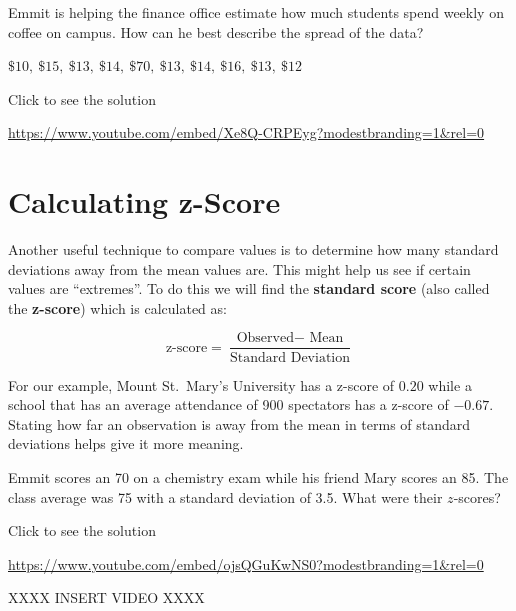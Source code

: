 \documentclass[
  letterpaper,
  DIV=11,
  numbers=noendperiod]{scrreprt}
\begin{document}
\begin{tcolorbox}[enhanced jigsaw, colframe=quarto-callout-tip-color-frame, colback=white, breakable, rightrule=.15mm, title=\textcolor{quarto-callout-tip-color}{\faLightbulb}\hspace{0.5em}{Try it Out}, bottomtitle=1mm, toptitle=1mm, titlerule=0mm, left=2mm, coltitle=black, colbacktitle=quarto-callout-tip-color!10!white, leftrule=.75mm, opacitybacktitle=0.6, bottomrule=.15mm, opacityback=0, arc=.35mm, toprule=.15mm]

Emmit is helping the finance office estimate how much students spend
weekly on coffee on campus. How can he best describe the spread of the
data?

\(\$10,\ \$15,\ \$13,\ \$14,\ \$70,\ \$13,\ \$14,\ \$16,\ \$13,\ \$12\)

Click to see the solution

\url{https://www.youtube.com/embed/Xe8Q-CRPEyg?modestbranding=1&rel=0}

\end{tcolorbox}

\section{Calculating z-Score}\label{calculating-z-score}

Another useful technique to compare values is to determine how many
standard deviations away from the mean values are. This might help us
see if certain values are ``extremes''. To do this we will find the
\textbf{standard score} (also called the \textbf{z-score}) which is
calculated as:

\[
\text{z-score}=\frac{\text{Observed} - \text{ Mean}}{\text{Standard Deviation}}
\]

For our example, Mount St.~Mary's University has a z-score of \(0.20\)
while a school that has an average attendance of 900 spectators has a
z-score of \(-0.67\). Stating how far an observation is away from the
mean in terms of standard deviations helps give it more meaning.

\begin{tcolorbox}[enhanced jigsaw, colframe=quarto-callout-tip-color-frame, colback=white, breakable, rightrule=.15mm, title=\textcolor{quarto-callout-tip-color}{\faLightbulb}\hspace{0.5em}{Try it Out}, bottomtitle=1mm, toptitle=1mm, titlerule=0mm, left=2mm, coltitle=black, colbacktitle=quarto-callout-tip-color!10!white, leftrule=.75mm, opacitybacktitle=0.6, bottomrule=.15mm, opacityback=0, arc=.35mm, toprule=.15mm]

Emmit scores an 70 on a chemistry exam while his friend Mary scores an
85. The class average was 75 with a standard deviation of 3.5. What were
their \(z\)-scores?

Click to see the solution

\url{https://www.youtube.com/embed/ojsQGuKwNS0?modestbranding=1&rel=0}

XXXX INSERT VIDEO XXXX

\end{tcolorbox}
\end{document}
